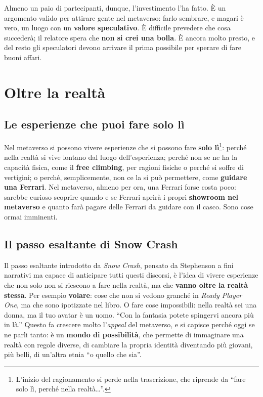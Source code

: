 Almeno un paio di partecipanti, dunque, l'investimento l'ha fatto. È un argomento
valido per attirare gente nel metaverso: farlo sembrare, e magari è vero, un
luogo con un \textbf{valore speculativo}. È difficile prevedere che cosa
succederà; il relatore spera che \textbf{non si crei una bolla}. È ancora molto
presto, e del resto gli speculatori devono arrivare il prima possibile per sperare
di fare buoni affari.

\section{Oltre la realtà}
\label{z8:sec:oltre}

\subsection{Le esperienze che puoi fare solo lì}

Nel metaverso si possono vivere esperienze che si possono fare \textbf{solo
lì}\footnote{L'inizio del ragionamento si perde nella trascrizione, che
riprende da ``fare solo lì, perché nella realtà\dots''.}: perché nella realtà si
vive lontano dal luogo dell'esperienza; perché non se ne ha la capacità fisica,
come il \textbf{free climbing}, per ragioni fisiche o perché si soffre di
vertigini; o perché, semplicemente, non ce la si può permettere, come
\textbf{guidare una Ferrari}. Nel metaverso, almeno per ora, una Ferrari forse
costa poco: sarebbe curioso scoprire quando e se Ferrari aprirà i propri
\textbf{showroom nel metaverso} e quanto farà pagare delle Ferrari da guidare con
il casco. Sono cose ormai imminenti.

\subsection{Il passo esaltante di Snow Crash}

Il passo esaltante introdotto da \emph{Snow Crash}, pensato da Stephenson a fini
narrativi ma capace di anticipare tutti questi discorsi, è l'idea di vivere
esperienze che non solo non si riescono a fare nella realtà, ma che
\textbf{vanno oltre la realtà stessa}. Per esempio \textbf{volare}: cose che non
si vedono granché in \emph{Ready Player One}, ma che sono ipotizzate nel libro.
O fare cose impossibili: nella realtà sei una donna, ma il tuo avatar è un uomo.
``Con la fantasia potete spingervi ancora più in là.'' Questo fa crescere molto
l'\emph{appeal} del metaverso, e si capisce perché oggi se ne parli tanto: è un
\textbf{mondo di possibilità}, che permette di immaginare una realtà con regole
diverse, di cambiare la propria identità diventando più giovani, più belli, di
un'altra etnia ``o quello che sia''.

